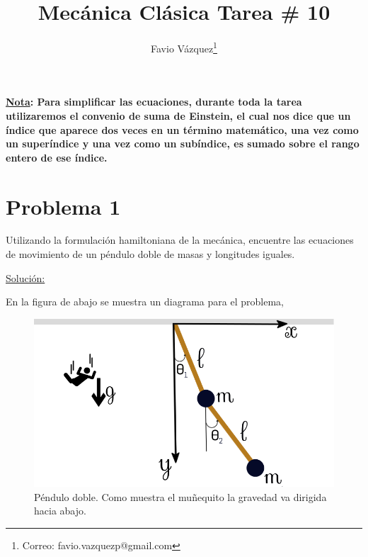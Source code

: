 \documentclass[a4paper,10pt]{article}
\title{Mecánica Clásica Tarea \# 10}
\author{Favio Vázquez\thanks{Correo: favio.vazquezp@gmail.com}}\affil{Instituto de Ciencias Nucleares. Universidad Nacional Autónoma de México.}
\date{}
\numberwithin{equation}{section}
\begin{document}
\makeatletter
\def\@maketitle{%
  \newpage
  \null
  \vskip 2em%
  \begin{center}%
  \let \footnote \thanks
    {\Large\bfseries \@title \par}%
    \vskip 1.5em%
    {\normalsize
      \lineskip .5em%
      \begin{tabular}[t]{c}%
        \@author
      \end{tabular}\par}%
    \vskip 1em%
    {\normalsize \@date}%
  \end{center}%
  \par
  \vskip 1.5em}
\makeatother

\maketitle

\textbf{\underline{Nota}: Para simplificar las ecuaciones, durante toda la tarea 
utilizaremos el convenio de suma de Einstein, el cual nos dice 
que un índice que aparece dos veces en un término matemático, una vez como un 
superíndice y una vez como un subíndice, es sumado sobre el rango entero de ese 
índice.}

\section{Problema 1}

Utilizando la formulación hamiltoniana de la mecánica, encuentre las ecuaciones de 
movimiento de un péndulo doble de masas y longitudes iguales.

\vspace{.3cm}

\underline{Solución:} \vspace{.3cm}

En la figura de abajo se muestra un diagrama para el problema,

\begin{figure}[H]
 \center
 \includegraphics[scale=0.4]{problema1fig1.png}
 \caption{Péndulo doble. Como muestra el muñequito la gravedad va dirigida hacia 
 abajo.}
 \label{fig:problema1fig1}
\end{figure}
\end{document}
